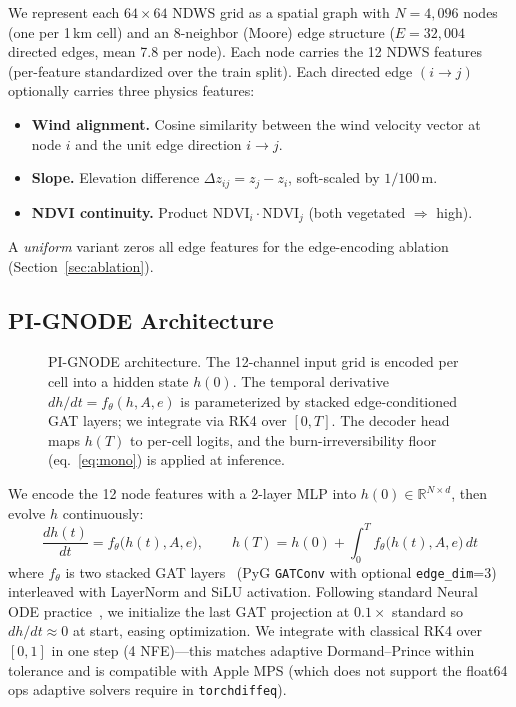 \documentclass{article}
\begin{document}
We represent each $64{\times}64$ NDWS grid as a spatial graph with
$N{=}4{,}096$ nodes (one per 1\,km cell) and an 8-neighbor (Moore) edge
structure ($E{=}32{,}004$ directed edges, mean 7.8 per node). Each node
carries the 12 NDWS features (per-feature standardized over the train
split). Each directed edge $(i\to j)$ optionally carries three physics
features:
\begin{itemize}\itemsep0pt
\item \textbf{Wind alignment.} Cosine similarity between the wind velocity
vector at node $i$ and the unit edge direction $i \to j$.
\item \textbf{Slope.} Elevation difference $\Delta z_{ij} = z_j - z_i$,
soft-scaled by $1/100$\,m.
\item \textbf{NDVI continuity.} Product $\mathrm{NDVI}_i \cdot \mathrm{NDVI}_j$
(both vegetated $\Rightarrow$ high).
\end{itemize}
A \emph{uniform} variant zeros all edge features for the edge-encoding
ablation (Section~\ref{sec:ablation}).

\subsection{PI-GNODE Architecture}

\begin{figure}[h]\centering

\caption{PI-GNODE architecture. The 12-channel input grid is encoded per
cell into a hidden state $h(0)$. The temporal derivative $dh/dt =
f_\theta(h, A, e)$ is parameterized by stacked edge-conditioned GAT layers;
we integrate via RK4 over $[0, T]$. The decoder head maps $h(T)$ to
per-cell logits, and the burn-irreversibility floor (eq.~\ref{eq:mono}) is
applied at inference.}\label{fig:schematic}
\end{figure}

We encode the 12 node features with a 2-layer MLP into $h(0) \in
\mathbb{R}^{N \times d}$, then evolve $h$ continuously:
\begin{equation}\label{eq:ode}
\frac{dh(t)}{dt} = f_\theta\!\bigl(h(t), A, e\bigr), \qquad
h(T) = h(0) + \int_0^T f_\theta\!\bigl(h(t), A, e\bigr)\,dt
\end{equation}
where $f_\theta$ is two stacked GAT layers~\cite{velickovic2018gat} (PyG
\texttt{GATConv} with optional \texttt{edge\_dim}=3) interleaved with
LayerNorm and SiLU activation. Following standard Neural ODE
practice~\cite{chen2018neuralode}, we initialize the last GAT projection at
$0.1\times$ standard so $dh/dt \approx 0$ at start, easing optimization. We
integrate with classical RK4 over $[0, 1]$ in one step (4 NFE)---this matches
adaptive Dormand--Prince within tolerance and is compatible with Apple MPS
(which does not support the float64 ops adaptive solvers require in
\texttt{torchdiffeq}).
\end{document}
